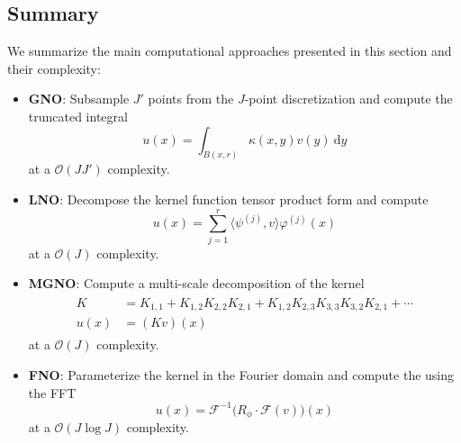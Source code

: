 \documentclass[twoside,12pt]{ctexart}
\newcommand{\cG}{\mathcal{F}}
\begin{document}
\subsection{Summary}
We summarize the main computational approaches presented in this section and their complexity:
\begin{itemize}

\item \textbf{GNO}:    Subsample $J'$ points from the $J$-point discretization and compute the truncated integral
\begin{equation}
u(x)=   
\int_{B(x,r)} \kappa (x,y) v(y) \: \text{d}y 
\end{equation}
at a \(\mathcal{O}(J J')\) complexity.

\item \textbf{LNO}:   Decompose the kernel function tensor product form and compute
\begin{equation}
u(x) =   \sum_{j=1}^r \langle \psi^{(j)}, v \rangle \varphi^{(j)}(x)
\end{equation}
at a \(\mathcal{O}(J)\) complexity.

\item \textbf{MGNO}: Compute a multi-scale decomposition of the kernel 
\begin{align}
\begin{split}
K &= K_{1,1} + K_{1,2}K_{2,2}K_{2,1} + K_{1,2}K_{2,3}K_{3,3}K_{3,2}K_{2,1} + \cdots \\
u(x) &= (Kv)(x)
\end{split}
\end{align}
at a \(\mathcal{O}(J)\) complexity.

\item \textbf{FNO}: Parameterize the kernel in the Fourier domain and compute the using the FFT 
\begin{equation}
u(x) = \cG^{-1} \bigl( R_\phi \cdot \cG(v) \bigr )(x)
\end{equation}
at a \(\mathcal{O}(J \log J)\) complexity.
\end{itemize}

%
%

%


%
%


\end{document}
